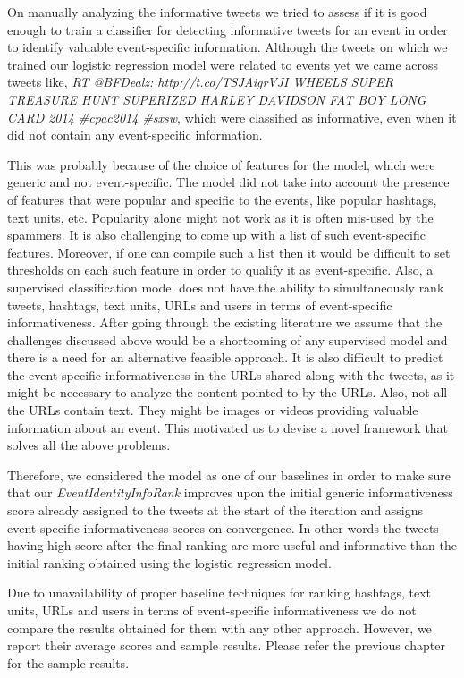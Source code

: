 \begin{enumerate}
On manually analyzing the informative tweets we tried to assess if it is good enough to train a classifier for detecting informative tweets for an event in order to identify valuable event-specific information. Although the tweets on which we trained our logistic regression model were related to events yet we came across tweets like, \textit{RT @BFDealz: http://t.co/TSJAigrVJI WHEELS SUPER TREASURE HUNT SUPERIZED HARLEY DAVIDSON FAT BOY LONG CARD 2014 \#cpac2014 \#sxsw}, which were classified as informative, even when it did not contain any event-specific information. 

This was probably because of the choice of features for the model, which were generic and not event-specific. The model did not take into account the presence of features that were popular and specific to the events, like popular hashtags, text units, etc. Popularity alone might not work as it is often mis-used by the spammers. It is also challenging to come up with a list of such event-specific features. Moreover, if one can compile such a list then it would be difficult to set thresholds on each such feature in order to qualify it as event-specific. Also, a supervised classification model does not have the ability to simultaneously rank tweets, hashtags, text units, URLs and users in terms of event-specific informativeness. After going through the existing literature we assume that the challenges discussed above would be a shortcoming of any supervised model and there is a need for an alternative feasible approach. It is also difficult to predict the event-specific informativeness in the URLs shared along with the tweets, as it might be necessary to analyze the content pointed to by the URLs. Also, not all the URLs contain text. They might be images or videos providing valuable information about an event. This motivated us to devise a novel framework that solves all the above problems.


Therefore, we considered the model as one of our baselines in order to make sure that our \textit{EventIdentityInfoRank} improves upon the initial generic informativeness score already assigned to the tweets at the start of the iteration and assigns event-specific informativeness scores on convergence. In other words the tweets having high score after the final ranking are more useful and informative than the initial ranking obtained using the logistic regression model.

\end{enumerate}


Due to unavailability of proper baseline techniques for ranking hashtags, text units, URLs and users in terms of event-specific informativeness we do not compare the results obtained for them with any other approach. However, we report their average scores and sample results. Please refer the previous chapter for the sample results.

